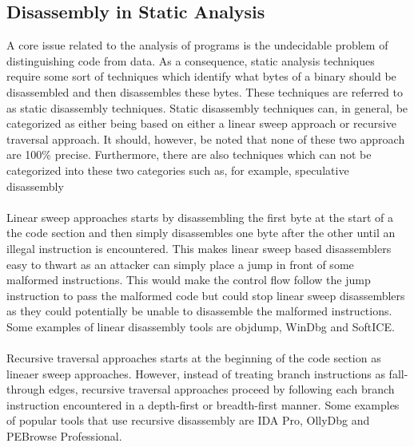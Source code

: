 \documentclass{kththesis}
\begin{document}
\subsection{Disassembly in Static Analysis}
A core issue related to the analysis of programs is the undecidable problem of distinguishing code from data\cite{ABinaryRewriting}. As a consequence, static analysis techniques require some sort of techniques which identify what bytes of a binary should be disassembled and then disassembles these bytes. These techniques are referred to as static disassembly techniques. Static disassembly techniques can, in general, be categorized as either being based on either a linear sweep approach or recursive traversal approach\cite{DisassemblyOfExecutable}. It should, however, be noted that none of these two approach are 100\% precise\cite{ABinaryRewriting}. Furthermore, there are also techniques which can not be categorized into these two categories such as, for example, speculative disassembly\cite{preciseCFG}
\\ \\
Linear sweep approaches starts by disassembling the first byte at the start of a the code section and then simply disassembles one byte after the other until an illegal instruction is encountered\cite{ABinaryRewriting}. This makes linear sweep based disassemblers easy to thwart as an attacker can simply place a jump in front of some malformed instructions. This would make the control flow follow the jump instruction to pass the malformed code but could stop linear sweep disassemblers as they could potentially be unable to disassemble the malformed instructions\cite{ABinaryRewriting}. Some examples of linear disassembly tools are objdump, WinDbg and SoftICE\cite{ReversingSecretsofReverseEngineering}.
\\ \\ 
Recursive traversal approaches starts at the beginning of the code section as lineaer sweep approaches. However, instead of treating branch instructions as fall-through edges, recursive traversal approaches proceed by following each branch instruction encountered in a depth-first or breadth-first manner. Some examples of popular tools that use recursive disassembly are IDA Pro, OllyDbg and PEBrowse Professional\cite{ReversingSecretsofReverseEngineering}.

\end{document}
